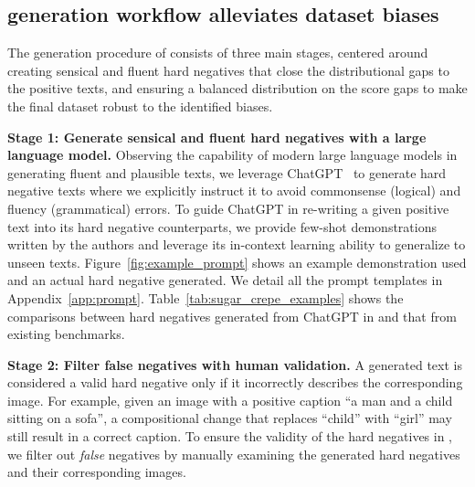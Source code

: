 


\subsection{\method generation workflow alleviates dataset biases}
\label{sec:data_generation}

The generation procedure of \method consists of three main stages, centered around creating sensical and fluent hard negatives that close the distributional gaps to the positive texts, and ensuring a balanced distribution on the score gaps to make the final dataset robust to the identified biases.

\textbf{Stage 1: Generate sensical and fluent hard negatives with a large language model.}
Observing the capability of modern large language models in generating fluent and plausible texts, we leverage ChatGPT~\cite{chatgpt} to generate hard negative texts where we explicitly instruct it to avoid commonsense (logical) and fluency (grammatical) errors. To guide ChatGPT in re-writing a given positive text into its hard negative counterparts, we provide few-shot demonstrations written by the authors and leverage its in-context learning ability to generalize to unseen texts.
Figure~\ref{fig:example_prompt} shows an example demonstration used and an actual hard negative generated.
We detail all the prompt templates in Appendix~\ref{app:prompt}.
Table~\ref{tab:sugar_crepe_examples} shows the comparisons between hard negatives generated from ChatGPT in \method and that from existing benchmarks.

\textbf{Stage 2: Filter false negatives with human validation.}
A generated text is considered a valid hard negative only if it incorrectly describes the corresponding image. For example, given an image with a positive caption ``a man and a child sitting on a sofa'', a compositional change that replaces ``child'' with ``girl'' may still result in a correct caption.
To ensure the validity of the hard negatives in \method, we filter out \textit{false} negatives by manually examining the generated hard negatives and their corresponding images.

